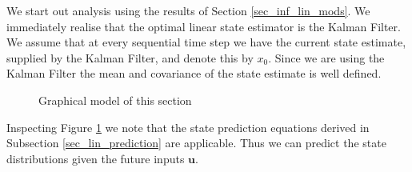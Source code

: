 We start out analysis using the results of Section \ref{sec_inf_lin_mods}. We immediately realise that the optimal linear state estimator is the Kalman Filter. We assume that at every sequential time step we have the current state estimate, supplied by the Kalman Filter, and denote this by $x_0$. Since we are using the Kalman Filter the mean and covariance of the state estimate is well defined. 
\begin{figure}[H] 
\centering
{}
\caption{Graphical model of this section}
\label{fig_gm_mpc}
\end{figure}
Inspecting Figure \ref{fig_gm_mpc} we note that the state prediction equations derived in Subsection \ref{sec_lin_prediction} are applicable. Thus we can predict the state distributions given the future inputs $\mathbf{u}$.

